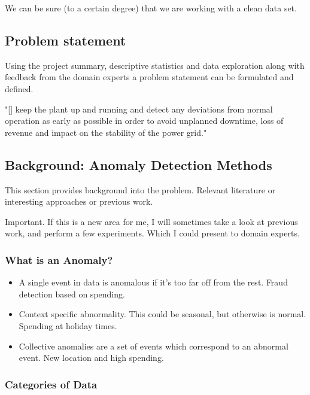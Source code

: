 \documentclass[11pt]{article}
\begin{document}
We can be sure (to a certain degree) that we are working with a clean
data set.

    \subsection{Problem statement}\label{problem-statement}

Using the project summary, descriptive statistics and data exploration
along with feedback from the domain experts a problem statement can be
formulated and defined.

"{[}{]} keep the plant up and running and detect any deviations from
normal operation as early as possible in order to avoid unplanned
downtime, loss of revenue and impact on the stability of the power
grid."

    \subsection{Background: Anomaly Detection
Methods}\label{background-anomaly-detection-methods}

This section provides background into the problem. Relevant literature
or interesting approaches or previous work.

Important. If this is a new area for me, I will sometimes take a look at
previous work, and perform a few experiments. Which I could present to
domain experts.

\subsubsection{What is an Anomaly?}\label{what-is-an-anomaly}

\begin{itemize}
\item
  A single event in data is anomalous if it's too far off from the rest.
  Fraud detection based on spending.
\item
  Context specific abnormality. This could be seasonal, but otherwise is
  normal. Spending at holiday times.
\item
  Collective anomalies are a set of events which correspond to an
  abnormal event. New location and high spending.
\end{itemize}

\subsubsection{Categories of Data}\label{categories-of-data}
\end{document}
